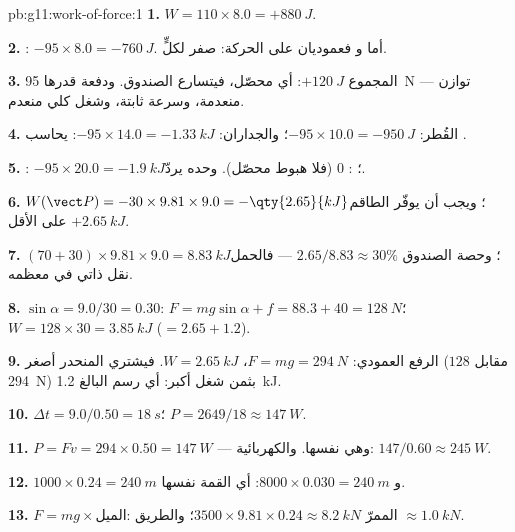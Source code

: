 \begin{solution}{pb:g11:work-of-force:1}
\textbf{1.} $W = 110 \times 8.0 = +\qty{880}{J}$.

\textbf{2.} : $-95 \times 8.0 = -\qty{760}{J}$. أما  و
 فعموديان على الحركة: صفر لكلٍّ.

\textbf{3.} المجموع $+\qty{120}{J}$: أي  محصّل، فيتسارع الصندوق.
ودفعة قدرها \qty{95}{N} توازن  ---  منعدمة، وسرعة
ثابتة، وشغل كلي منعدم.

\textbf{4.} القُطر: $-95 \times 10.0 = -\qty{950}{J}$؛ والجداران:
$-95 \times 14.0 = -\qty{1.33}{kJ}$:  يحاسب .

\textbf{5.} : $-95 \times 20.0 = -\qty{1.9}{kJ}$؛ :
$0$ (فلا هبوط محصّل).  وحده يردّ.

\textbf{6.} $W(\vect P) = -30 \times 9.81 \times 9.0 =
-\qty{2.65}{kJ}$؛ ويجب أن يوفّر الطاقم $+\qty{2.65}{kJ}$ على الأقل.

\textbf{7.} $(70 + 30) \times 9.81 \times 9.0 = \qty{8.83}{kJ}$؛ وحصة
الصندوق $2.65/8.83 \approx 30\%$ --- فالحمل نقل ذاتي في معظمه.

\textbf{8.} $\sin\alpha = 9.0/30 = 0.30$:
$F = mg\sin\alpha + f = 88.3 + 40 = \qty{128}{N}$؛
$W = 128 \times 30 = \qty{3.85}{kJ}$ ($= 2.65 + 1.2$).

\textbf{9.} الرفع العمودي: $F = mg = \qty{294}{N}$،
$W = \qty{2.65}{kJ}$. فيشتري المنحدر  أصغر ($128$ مقابل
\qty{294}{N}) بثمن شغل أكبر: أي رسم  البالغ \qty{1.2}{kJ}.

\textbf{10.} $\Delta t = 9.0/0.50 = \qty{18}{s}$؛
$P = 2649/18 \approx \qty{147}{W}$.

\textbf{11.} $P = Fv = 294 \times 0.50 = \qty{147}{W}$ --- وهي نفسها.
والكهربائية: $147/0.60 \approx \qty{245}{W}$.

\textbf{12.} $1000 \times 0.24 = \qty{240}{m}$ و
$8000 \times 0.030 = \qty{240}{m}$: أي القمة نفسها.

\textbf{13.} $F = mg \times \text{الميل}$: الممرّ
$3500 \times 9.81 \times 0.24 \approx \qty{8.2}{kN}$؛ والطريق
$\approx \qty{1.0}{kN}$.


\end{solution}
